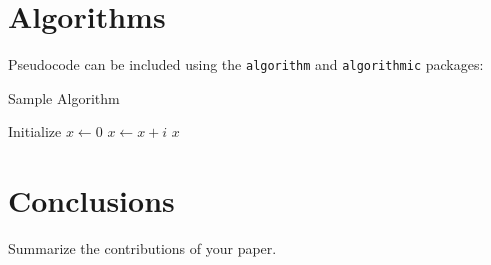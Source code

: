 \documentclass[twoside]{article}
\begin{document}
\section{Algorithms}

Pseudocode can be included using the \texttt{algorithm} and \texttt{algorithmic} packages:

\begin{algorithm}
\caption{Sample Algorithm}
\label{alg:example}
\begin{algorithmic}[1]
\STATE Initialize $x \gets 0$
    \STATE $x \gets x + i$
\ENDFOR
\RETURN $x$
\end{algorithmic}
\end{algorithm}

\section{Conclusions}

Summarize the contributions of your paper.



\end{document}
